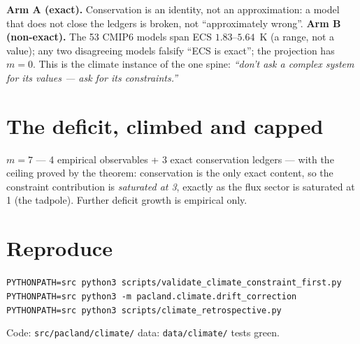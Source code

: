 \documentclass[11pt]{article}
\begin{document}
\textbf{Arm A (exact).} Conservation is an identity, not an approximation: a model
that does not close the ledgers is broken, not ``approximately wrong''.
\textbf{Arm B (non-exact).} The 53 CMIP6 models span ECS $1.83$--$5.64$~K (a
range, not a value); any two disagreeing models falsify ``ECS is exact''; the
projection has $m = 0$. This is the climate instance of the one spine:
\emph{``don't ask a complex system for its values --- ask for its constraints.''}

\section{The deficit, climbed and capped}

$m = 7$ --- 4 empirical observables + 3 exact conservation ledgers --- with the
ceiling proved by the theorem: conservation is the only exact content, so the
constraint contribution is \emph{saturated at 3}, exactly as the flux sector is
saturated at 1 (the tadpole). Further deficit growth is empirical only.

\section*{Reproduce}

\noindent
\texttt{PYTHONPATH=src python3 scripts/validate\_climate\_constraint\_first.py}\\
\texttt{PYTHONPATH=src python3 -m pacland.climate.drift\_correction}\\
\texttt{PYTHONPATH=src python3 scripts/climate\_retrospective.py}

\noindent Code: \texttt{src/pacland/climate/} \quad data: \texttt{data/climate/}
 tests green.
\end{document}
